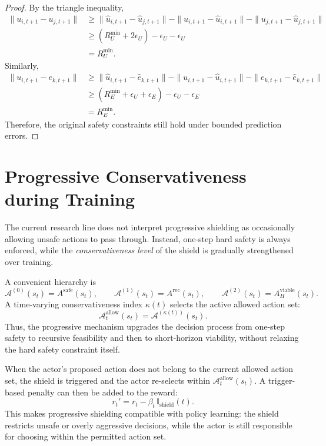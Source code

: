 \documentclass[11pt]{article}
\begin{document}
\begin{proof}
By the triangle inequality,
\begin{align}
\|u_{i,t+1} - u_{j,t+1}\|
&\ge
\|\hat u_{i,t+1} - \hat u_{j,t+1}\|
- \|u_{i,t+1} - \hat u_{i,t+1}\|
- \|u_{j,t+1} - \hat u_{j,t+1}\| \\
&\ge
(R_U^{\min} + 2\epsilon_U) - \epsilon_U - \epsilon_U \\
&=
R_U^{\min}.
\end{align}
Similarly,
\begin{align}
\|u_{i,t+1} - e_{k,t+1}\|
&\ge
\|\hat u_{i,t+1} - \hat e_{k,t+1}\|
- \|u_{i,t+1} - \hat u_{i,t+1}\|
- \|e_{k,t+1} - \hat e_{k,t+1}\| \\
&\ge
(R_E^{\min} + \epsilon_U + \epsilon_E) - \epsilon_U - \epsilon_E \\
&=
R_E^{\min}.
\end{align}
Therefore, the original safety constraints still hold under bounded prediction errors.
\end{proof}

\section{Progressive Conservativeness during Training}

The current research line does not interpret progressive shielding as occasionally allowing unsafe actions to pass through. Instead, one-step hard safety is always enforced, while the \emph{conservativeness level} of the shield is gradually strengthened over training.

A convenient hierarchy is
\begin{equation}
\mathcal A^{(0)}(s_t)=A^{\mathrm{safe}}(s_t),
\qquad
\mathcal A^{(1)}(s_t)=A^{\mathrm{rec}}(s_t),
\qquad
\mathcal A^{(2)}(s_t)=A_H^{\mathrm{viable}}(s_t).
\end{equation}
A time-varying conservativeness index $\kappa(t)$ selects the active allowed action set:
\begin{equation}
\mathcal A_t^{\mathrm{allow}}(s_t)=\mathcal A^{(\kappa(t))}(s_t).
\end{equation}
Thus, the progressive mechanism upgrades the decision process from one-step safety to recursive feasibility and then to short-horizon viability, without relaxing the hard safety constraint itself.

When the actor's proposed action does not belong to the current allowed action set, the shield is triggered and the actor re-selects within $\mathcal A_t^{\mathrm{allow}}(s_t)$. A trigger-based penalty can then be added to the reward:
\begin{equation}
r_t' = r_t - \beta_t \, \mathbb I_{\mathrm{shield}}(t).
\end{equation}
This makes progressive shielding compatible with policy learning: the shield restricts unsafe or overly aggressive decisions, while the actor is still responsible for choosing within the permitted action set.
\end{document}
